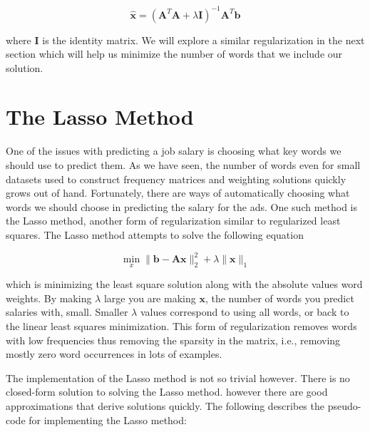 \documentclass[12pt]{article}
\begin{document}
    \begin{equation}
        \bm{\hat{x}} = (\bm{A}^{T}\bm{A} + \lambda \bm{I})^{-1}\bm{A}^T\bm{b}
    \end{equation}

    \noindent where $\bm{I}$ is the identity matrix. We will explore a similar
    regularization in the next section which will help us minimize the number
    of words that we include our solution.

\section{The Lasso Method}

    One of the issues with predicting a job salary is choosing what key words
    we should use to predict them. As we have seen, the number of words even
    for small datasets used to construct frequency matrices and weighting
    solutions quickly grows out of hand. Fortunately, there are ways of
    automatically choosing what words we should choose in predicting the salary
    for the ads. One such method is the Lasso method, another form of
    regularization similar to regularized least squares. The Lasso method
    attempts to solve the following equation

    \begin{equation}
        \min_x \|\bm{b} - \bm{Ax}\|_2^2 + \lambda\|\bm{x}\|_1
    \end{equation}

    \noindent which is minimizing the least square solution along with the
    absolute values word weights. By making $\lambda$ large you are making
    $\bm{x}$, the number of words you predict salaries with, small. Smaller
    $\lambda$ values correspond to using all words, or back to the linear least
    squares minimization. This form of regularization removes words with low
    frequencies thus removing the sparsity in the matrix, i.e., removing mostly
    zero word occurrences in lots of examples. 

    The implementation of the Lasso method is not so trivial however. There is
    no closed-form solution to solving the Lasso method. however there are good
    approximations that derive solutions quickly. The following describes the
    pseudo-code for implementing the Lasso method:
\end{document}
